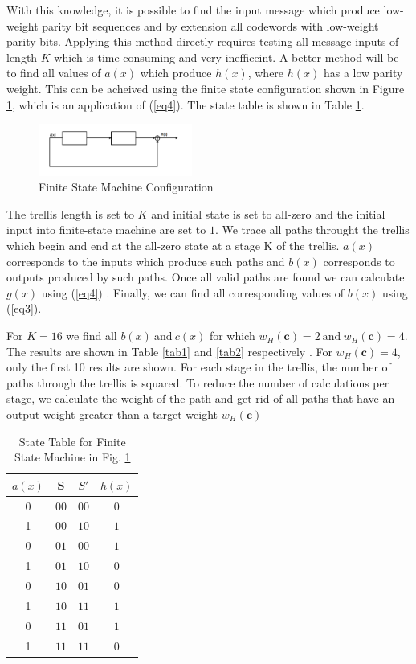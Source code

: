 \documentclass[fontsize=12pt]{article}
\begin{document}
 With this knowledge, it is possible to find the input message which produce low-weight parity bit sequences and by extension all codewords  with low-weight parity bits. Applying this method directly requires testing all message inputs of length $K$ which is time-consuming and very inefficeint. A better method will be to find all values of $a(x)$ which produce $h(x)$, where $h(x)$ has a low parity weight. This can be acheived using the finite state configuration shown in Figure \ref{fig2}, which is an application of (\ref{eq4}). The state table is shown in Table \ref{tab3}. 
 
\begin{figure}[h]
\centering
		\includegraphics[width=0.45\textwidth]{fsm.png}
		\caption{Finite State Machine Configuration}
		\label{fig2}
		\end{figure}
		
		
		
		The trellis length is set to $K$ and initial state is set to all-zero and the initial input into finite-state machine are set to $1$.  We trace all paths throught the trellis which begin and end at the all-zero state at a stage K of the trellis. $a(x)$ corresponds to the inputs which produce such paths and $b(x)$ corresponds to outputs produced by such paths. Once all valid paths are found we can calculate $g(x)$ using (\ref{eq4}) . Finally, we can find all corresponding values of $b(x)$ using (\ref{eq3}).
 
 For $K=16$ we find all $b(x) ~\text{and}~ c(x)$ for which $w_H(\textbf{c})=2 ~\text{and} ~ w_H(\textbf{c})=4$. The results are shown in Table \ref{tab1} and \ref{tab2} respectively . For $w_H(\textbf{c})=4$, only the first 10 results are shown. 
  For each stage in the trellis, the number of paths through the trellis is squared. To reduce the number of calculations per stage, we calculate the weight of the path and get rid of all paths that have an output weight greater than a target weight $w_H(\textbf{c})$
  \begin{table}[h!]
 
 \caption{State Table for Finite State Machine in Fig. \ref{fig2}}
\centering
 \begin{tabular}{c c c c} 
 \hline
 $a(x)$ & S & $S'$ & $h(x)$ \\ [0.5ex] 
 \hline\hline
 0 & $0 0 $& $0 0$ & $0$\\ 
  1& $0 0$ & $1 0$ & $1$ \\
  0 & $0 1$& $0 0$ & $1$ \\
  1& $0 1$& $1 0$& $0$ \\
  0& $1 0$ & $0 1$ & $0$ \\
 1 & $1 0 $ & $1 1$ & $1$\\ 
 0 & $1 1$ & $0 1$ & $1$ \\ 
 1 & $1 1$ & $1 1$ & $0$ \\ [1ex] 
 \hline
 \end{tabular}
 \label{tab3}
\end{table}
 
\end{document}
